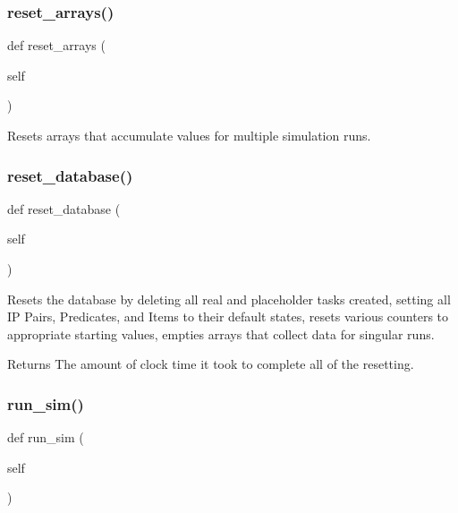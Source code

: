 \subsubsection{\texorpdfstring{reset\_arrays()}{reset\_arrays()}}
{\footnotesize\ttfamily def reset\+\_\+arrays (\begin{DoxyParamCaption}\item[{}]{self }\end{DoxyParamCaption})}



Resets arrays that accumulate values for multiple simulation runs. 

\mbox{\label{classdynamicfilterapp_1_1test__simulations_1_1_simulation_test_a5af6b7d43daa54fef6fc6580683e5c80}} 
\subsubsection{\texorpdfstring{reset\_database()}{reset\_database()}}
{\footnotesize\ttfamily def reset\+\_\+database (\begin{DoxyParamCaption}\item[{}]{self }\end{DoxyParamCaption})}



Resets the database by deleting all real and placeholder tasks created, setting all IP Pairs, Predicates, and Items to their default states, resets various counters to appropriate starting values, empties arrays that collect data for singular runs. 

\begin{DoxyReturn}{Returns}
The amount of clock time it took to complete all of the resetting. 
\end{DoxyReturn}
\mbox{\label{classdynamicfilterapp_1_1test__simulations_1_1_simulation_test_aafbc405f49645141a30302a448b056dc}} 
\subsubsection{\texorpdfstring{run\_sim()}{run\_sim()}}
{\footnotesize\ttfamily def run\+\_\+sim (\begin{DoxyParamCaption}\item[{}]{self }\end{DoxyParamCaption})}



